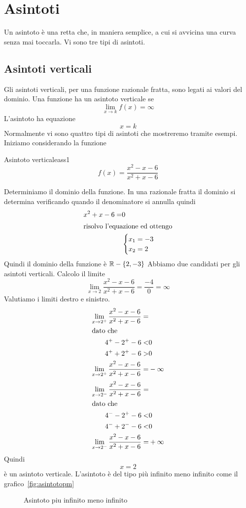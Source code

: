 \chapter{Asintoti}
Un asintoto è una retta che, in maniera semplice, a cui si avvicina una curva senza mai toccarla. Vi sono tre tipi di asintoti. 
\section{Asintoti verticali}
Gli asintoti verticali, per una funzione razionale fratta, sono legati ai valori del dominio.
Una funzione ha un asintoto verticale se 
\[\lim_{x\to k}f(x)=\infty\]
L'asintoto ha equazione \[ x=k\]
Normalmente vi sono quattro tipi di  asintoti che mostreremo tramite esempi.
Iniziamo  
considerando la funzione 
\begin{esempiot}{Asintoto verticale}{ass1}
\[f(x)=\dfrac{x^2-x-6}{x^2+x-6} \]
\end{esempiot}
Determiniamo il dominio
della funzione. In una razionale fratta il dominio si determina verificando quando il denominatore si annulla quindi
\begin{align*}
x^2+x-6=&0\\
\intertext{risolvo l'equazione ed ottengo}
&\begin{cases}
x_1=-3\\
x_2=2
\end{cases}
\end{align*}
Quindi il dominio della funzione è $\mathbb{R}-\lbrace2,-3\rbrace$ Abbiamo due candidati per gli asintoti verticali.
Calcolo il limite \[ \lim_{x\to 2}\dfrac{x^2-x-6}{x^2+x-6}=\dfrac{-4}{0}=\infty\] Valutiamo i limiti destro e sinistro. 
\begin{align*}
\lim_{x\to 2^+}\dfrac{x^2-x-6}{x^2+x-6}=&\\
\intertext{dato che}
4^+-2^+-6<&0\\
4^++2^+-6>&0\\
\lim_{x\to 2^+}\dfrac{x^2-x-6}{x^2+x-6}=&-\infty\\
\end{align*}
\begin{align*}
\lim_{x\to 2^-}\dfrac{x^2-x-6}{x^2+x-6}=&\\
\intertext{dato che}
4^--2^+-6<&0\\
4^-+2^--6<&0\\
\lim_{x\to 2^-}\dfrac{x^2-x-6}{x^2+x-6}=&+\infty\\
\end{align*}
Quindi \[x=2\] è un asintoto verticale.
L'asintoto è del tipo più infinito meno infinito come il grafico~\vref{fig:asintotopm}
\begin{figure}
	\centering

\captionsetup{format=grafico}
	\caption[Asintoto piu infinito meno infinito]{Asintoto piu infinito meno infinito}
	\label{fig:asintotopm}
\end{figure}

